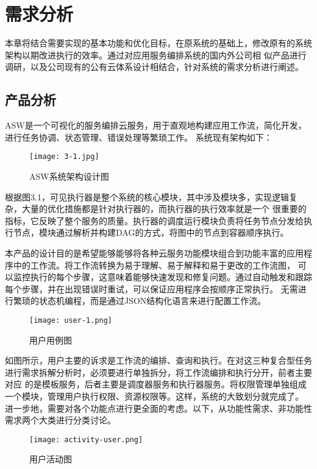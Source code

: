 
\chapter{需求分析}
本章将结合需要实现的基本功能和优化目标，在原系统的基础上，修改原有的系统架构以期改进执行的效率。通过对应用服务编排系统的国内外公司相
似产品进行调研，以及公司现有的公有云体系设计相结合，针对系统的需求分析进行阐述。

\section{产品分析}
ASW是一个可视化的服务编排云服务，用于直观地构建应用工作流，简化开发，进行任务协调、状态管理、错误处理等繁琐工作。
系统现有架构如下：

\begin{figure}[h]
    \centering
    \texttt{[image: 3-1.jpg]}
    \caption{ASW系统架构设计图}
    \label{fig:xtjg}
\end{figure}

根据图3.1，可见执行器是整个系统的核心模块，其中涉及模块多，实现逻辑复杂，大量的优化措施都是针对执行器的，而执行器的执行效率就是一个
很重要的指标，它反映了整个服务的质量。执行器的调度运行模块负责将任务节点分发给执行节点，模块通过解析并构建DAG的方式，将图中的节点到容器顺序执行。

本产品的设计目的是希望能够能够将各种云服务功能模块组合到功能丰富的应用程序中的工作流。将工作流转换为易于理解、易于解释和易于更改的工作流图，
可以监控执行的每个步骤，这意味着能够快速发现和修复问题。通过自动触发和跟踪每个步骤，并在出现错误时重试，可以保证应用程序会按顺序正常执行。
无需进行繁琐的状态机编程，而是通过JSON结构化语言来进行配置工作流。

\begin{figure}[H]
    \centering
    \texttt{[image: user-1.png]}
    \caption{用户用例图}
    \label{fig:yhyl}
\end{figure}

如图所示，用户主要的诉求是工作流的编排、查询和执行。在对这三种复合型任务进行需求拆解分析时，必须要进行单独拆分，将工作流编排和执行分开，前者主要对应
的是模板服务，后者主要是调度器服务和执行器服务。将权限管理单独组成一个模块，管理用户执行权限、资源权限等。这样，系统的大致划分就完成了。
进一步地，需要对各个功能点进行更全面的考虑。以下，从功能性需求、非功能性需求两个大类进行分类讨论。

\begin{figure}[H]
    \centering
    \texttt{[image: activity-user.png]}
    \caption{用户活动图}
    \label{fig:yhhd}
    \note{}
\end{figure}

